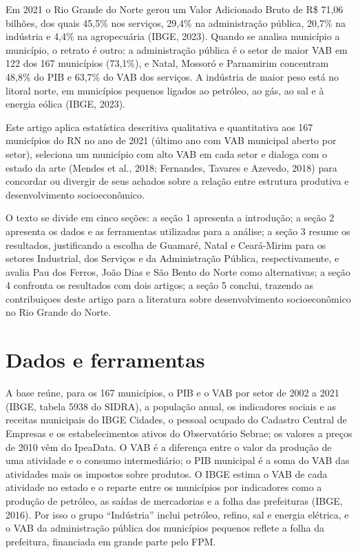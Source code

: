 \documentclass[12pt,a4paper]{article}
\begin{document}
Em 2021 o Rio Grande do Norte gerou um Valor Adicionado Bruto de R\$ 71,06 bilhões, dos quais 45,5\% nos serviços, 29,4\% na administração pública, 20,7\% na indústria e 4,4\% na agropecuária (IBGE, 2023). Quando se analisa município a município, o retrato é outro: a administração pública é o setor de maior VAB em 122 dos 167 municípios (73,1\%), e Natal, Mossoró e Parnamirim concentram 48,8\% do PIB e 63,7\% do VAB dos serviços. A indústria de maior peso está no litoral norte, em municípios pequenos ligados ao petróleo, ao gás, ao sal e à energia eólica (IBGE, 2023).

Este artigo aplica estatística descritiva qualitativa e quantitativa aos 167 municípios do RN no ano de 2021 (último ano com VAB municipal aberto por setor), seleciona um município com alto VAB em cada setor e dialoga com o estado da arte (Mendes et al., 2018; Fernandes, Tavares e Azevedo, 2018) para concordar ou divergir de seus achados sobre a relação entre estrutura produtiva e desenvolvimento socioeconômico.

O texto se divide em cinco seções: a seção 1 apresenta a introdução; a seção 2 apresenta os dados e as ferramentas utilizadas para a análise; a seção 3 resume os resultados, justificando a escolha de Guamaré, Natal e Ceará-Mirim para os setores Industrial, dos Serviços e da Administração Pública, respectivamente, e avalia Pau dos Ferros, João Dias e São Bento do Norte como alternativas; a seção 4 confronta os resultados com dois artigos; a seção 5 conclui, trazendo as contribuiçoes deste artigo para a literatura sobre desenvolvimento socioeconômico no Rio Grande do Norte.

\section{Dados e ferramentas}

A base reúne, para os 167 municípios, o PIB e o VAB por setor de 2002 a 2021 (IBGE, tabela 5938 do SIDRA), a população anual, os indicadores sociais e as receitas municipais do IBGE Cidades, o pessoal ocupado do Cadastro Central de Empresas e os estabelecimentos ativos do Observatório Sebrae; os valores a preços de 2010 vêm do IpeaData. O VAB é a diferença entre o valor da produção de uma atividade e o consumo intermediário; o PIB municipal é a soma do VAB das atividades mais os impostos sobre produtos. O IBGE estima o VAB de cada atividade no estado e o reparte entre os municípios por indicadores como a produção de petróleo, as saídas de mercadorias e a folha das prefeituras (IBGE, 2016). Por isso o grupo ``Indústria'' inclui petróleo, refino, sal e energia elétrica, e o VAB da administração pública dos municípios pequenos reflete a folha da prefeitura, financiada em grande parte pelo FPM.
\end{document}

